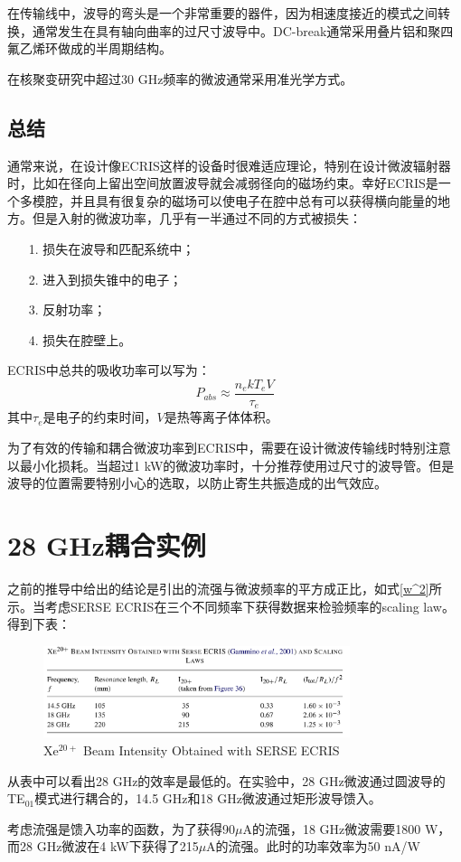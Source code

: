 \documentclass[fontset=windows]{article}
\begin{document}
在传输线中，波导的弯头是一个非常重要的器件，因为相速度接近的模式之间转换，通常发生在具有轴向曲率的过尺寸波导中。DC-break通常采用叠片铝和聚四氟乙烯环做成的半周期结构。

在核聚变研究中超过30 GHz频率的微波通常采用准光学方式。

\subsection{总结}
通常来说，在设计像ECRIS这样的设备时很难适应理论，特别在设计微波辐射器时，比如在径向上留出空间放置波导就会减弱径向的磁场约束。幸好ECRIS是一个多模腔，并且具有很复杂的磁场可以使电子在腔中总有可以获得横向能量的地方。但是入射的微波功率，几乎有一半通过不同的方式被损失：
\begin{enumerate}
    \item [1.]损失在波导和匹配系统中；
    \item [2.]进入到损失锥中的电子；
    \item [3.]反射功率；
    \item [4.]损失在腔壁上。
\end{enumerate}

ECRIS中总共的吸收功率可以写为：
\begin{equation}
    P_{abs}\approx\frac{n_ekT_eV}{\tau_e}
\end{equation}
其中$\tau_e$是电子的约束时间，$V$是热等离子体体积。

为了有效的传输和耦合微波功率到ECRIS中，需要在设计微波传输线时特别注意以最小化损耗。当超过1 kW的微波功率时，十分推荐使用过尺寸的波导管。但是波导的位置需要特别小心的选取，以防止寄生共振造成的出气效应。

\section{28 GHz耦合实例}
之前的推导中给出的结论是引出的流强与微波频率的平方成正比，如式\ref{w^2}所示。当考虑SERSE ECRIS在三个不同频率下获得数据来检验频率的scaling law。得到下表：
\begin{figure}
    \centering
    \includegraphics[width=0.8\textwidth]{Xe.png}
    \caption{Xe$^{20+}$ Beam Intensity Obtained with SERSE ECRIS}
\end{figure}
从表中可以看出28 GHz的效率是最低的。在实验中，28 GHz微波通过圆波导的TE$_{01}$模式进行耦合的，14.5 GHz和18 GHz微波通过矩形波导馈入。

考虑流强是馈入功率的函数，为了获得90$\mu \text{A}$的流强，18 GHz微波需要1800 W，而28 GHz微波在4 kW下获得了215$\mu \text{A}$的流强。此时的功率效率为50 nA/W



\end{document}
